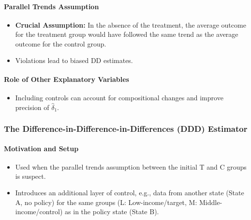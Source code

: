 \documentclass[a4paper, 10pt]{article}
\theoremstyle{definition}	%
\begin{document}
\paragraph{Parallel Trends Assumption} %
\begin{itemize}
    \item \textbf{Crucial Assumption:} In the absence of the treatment, the average outcome for the treatment group would have followed the same trend as the average outcome for the control group.
    \item Violations lead to biased DD estimates.
\end{itemize}

\paragraph{Role of Other Explanatory Variables} %
\begin{itemize}
    \item Including controls can account for compositional changes and improve precision of \(\hat{\delta}_1\).
\end{itemize}

\subsubsection{The Difference-in-Difference-in-Differences (DDD) Estimator} %
\paragraph{Motivation and Setup} %
\begin{itemize}
    \item Used when the parallel trends assumption between the initial T and C groups is suspect.
    \item Introduces an additional layer of control, e.g., data from another state (State A, no policy) for the same groups (L: Low-income/target, M: Middle-income/control) as in the policy state (State B).
\end{itemize}
\end{document}
